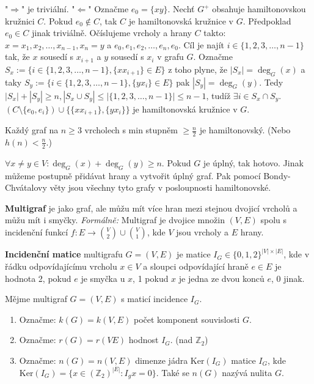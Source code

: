 \begin{dukaz}
	"$\Rightarrow$" je triviální. "$\Leftarrow$" Označme $e_{0} = \{xy\}$. Nechť $G^{+}$ obsahuje hamiltonovskou kružnici $C$. Pokud $e_{0} \notin C$, tak $C$ je hamiltonovská kružnice v $G$. Předpoklad $e_{0} \in C$ jinak triviálně. Očíslujeme vrcholy a hrany $C$ takto: $x = x_{1}, x_{2}, \dots, x_{n-1}, x_{n} = y$ a $e_{0}, e_{1}, e_{2}, \dots , e_{n}, e_{0}$. Cíl je najít $i \in \{1,2,3, \dots, n-1\}$ tak, že $x$ sousedí s $x_{i+1}$ a $y$ sousedí s $x_{i}$ v grafu $G$. Označme $S_{x} := \{i \in \{1,2,3,\dots,n-1\}, \{xx_{i+1}\} \in E\}$ z toho plyne, že $|S_{x}| = \deg_{G}(x)$ a taky $S_{y} := \{i \in \{1,2,3,\dots,n-1\}, \{yx_{i}\} \in E\}$ pak $|S_{y}| = \deg_{G}(y)$. Tedy $|S_{x}| + |S_{y}| \geq n, |S_{x} \cup S_{y}| \leq |\{1,2,3, \dots, n-1\}| \leq n-1$, tudíž $\exists i \in S_{x} \cap S_{y}$. $(C \setminus \{e_{0},e_{i}\}) \cup \{\{xx_{i+1}\},\{yx_{i}\}\}$ je hamiltonovská kružnice v $G$.
\end{dukaz}

\begin{dusl}[Dirac]
	Každý graf na $n \geq 3$ vrcholech s min stupněm $\geq \frac{n}{2}$ je hamiltonovský. (Nebo $h(n) < \frac{n}{2}$.)
\end{dusl}

\begin{dusl}
	$\forall x \neq y \in V: \deg_{G}(x) + \deg_{G}(y) \geq n$. Pokud $G$ je úplný, tak hotovo. Jinak můžeme postupně přidávat hrany a vytvořit úplný graf. Pak pomocí Bondy-Chvátalovy věty jsou všechny tyto grafy v posloupnosti hamiltonovské.
\end{dusl}

\begin{definice}
	\textbf{Multigraf} je jako graf, ale můžu mít více hran mezi stejnou dvojicí vrcholů a můžu mít i smyčky. \textit{Formálně:} Multigraf je dvojice množin $(V,E)$ spolu s incidenční funkcí $f: E \to \binom{V}{2} \cup \binom{V}{1}$, kde $V$ jsou vrcholy a $E$ hrany.
\end{definice}

\begin{definice}
	\textbf{Incidenční matice} multigrafu $G = (V,E)$ je matice $I_{G} \in \{0,1,2\}^{|V| \times |E|}$, kde v řádku odpovídajícímu vrcholu $x \in V$ a sloupci odpovídající hraně $e \in E$ je hodnota 2, pokud $e$ je smyčka u $x$, 1 pokud $x$ je jedna ze dvou konců $e$, 0 jinak.
\end{definice}

\begin{definice}
	Mějme multigraf $G = (V,E)$ s maticí incidence $I_{G}$.
	
	\begin{enumerate}
		\item Označme: $k(G) = k(V,E)$ počet komponent souvislosti $G$.
		\item Označme: $r(G) = r(VE)$ hodnost $I_{G}$. (nad $\mathbb{Z}_{2}$)
		\item Označme: $n(G) = n(V,E)$ dimenze jádra $\text{Ker}(I_{G})$ matice $I_{G}$, kde $\text{Ker}(I_{G}) = \{x \in (\mathbb{Z}_{2})^{|E|}: I_{g}x = 0\}$. Také se $n(G)$ nazývá nulita $G$.
	\end{enumerate}
\end{definice}

